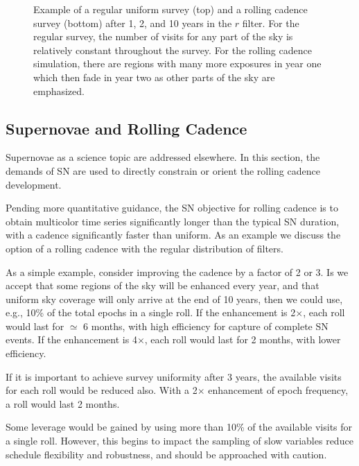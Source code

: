 \begin{figure}
  \caption{Example of a regular uniform survey (top) and a rolling cadence survey (bottom) after 1, 2, and 10 years in the $r$ filter.  For the regular survey, the number of visits for any part of the sky is relatively constant throughout the survey.  For the rolling cadence simulation, there are regions with many more exposures in year one which then fade in year two as other parts of the sky are emphasized.\label{fig:rollingcadence}}
\end{figure}

\subsection{ Supernovae and Rolling Cadence}
\label{sec:rolling:supernovae}


Supernovae as a science topic are addressed elsewhere.
In this section, the demands of SN are used to directly constrain or
orient the rolling cadence development.

Pending more quantitative guidance, the SN objective for rolling cadence is to obtain multicolor time series significantly longer than the typical SN duration, with a cadence significantly faster than uniform.  As an example we discuss the option of a rolling cadence with the regular distribution of filters.

As a simple example, consider improving the cadence by a factor of 2 or 3.  Is we accept that some regions of the sky will be enhanced every year, and that uniform sky coverage will only arrive at the end of 10 years, then we could use, e.g., 10\% of the total epochs in a single roll.  If the enhancement is 2$\times$, each roll would last for $\simeq$ 6 months, with high efficiency for capture of complete SN events.  If the enhancement is 4$\times$, each roll would last for 2 months, with lower efficiency.

If it is important to achieve survey uniformity after 3 years, the available visits for each roll would be reduced also.  With a 2$\times$ enhancement of epoch frequency, a roll would last 2 months.

Some leverage would be gained by using more than 10\% of the available visits for a single roll.  However, this begins to impact the sampling of slow variables reduce schedule flexibility and robustness, and should be approached with caution.

